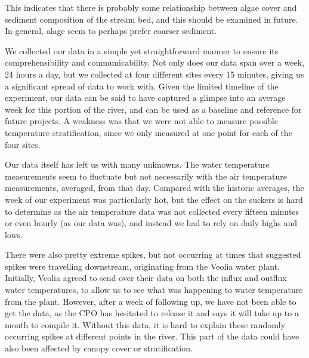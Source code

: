 \documentclass{article}\usepackage[]{graphicx}\usepackage[]{color}
\begin{document}
This indicates that there is probably some relationship between algae cover and sediment composition of the stream bed, and this should be examined in future. In general, alage seem to perhaps prefer coarser sediment. 

We collected our data in a simple yet straightforward manner to ensure its comprehensibility and communicability. Not only does our data span over a week, 24 hours a day, but we collected at four different sites every 15 minutes, giving us a significant spread of data to work with. Given the limited timeline of the experiment, our data can be said to have captured a glimpse into an average week for this portion of the river, and can be used as a baseline and reference for future projects. A weakness was that we were not able to measure possible temperature stratification, since we only measured at one point for each of the four sites. 

Our data itself has left us with many unknowns. The water temperature measurements seem to fluctuate but not necessarily with the air temperature measurements, averaged, from that day. Compared with the historic averages, the week of our experiment was particularly hot, but the effect on the suckers is hard to determine as the air temperature data was not collected every fifteen minutes or even hourly (as our data was), and instead we had to rely on daily highs and lows. 

There were also pretty extreme spikes, but not occurring at times that suggested spikes were travelling downstream, originating from the Veolia water plant. Initially, Veolia agreed to send over their data on both the influx and outflux water temperatures, to allow us to see what was happening to water temperature from the plant. However, after a week of following up, we have not been able to get the data, as the CPO has hesitated to release it and says it will take up to a month to compile it. Without this data, it is hard to explain these randomly occurring spikes at different points in the river. This part of the data could have also been affected by canopy cover or stratification. 
\end{document}
